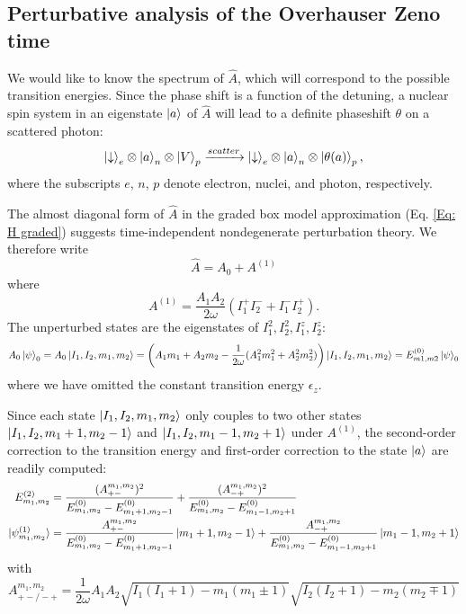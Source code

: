 \documentclass[aps, pra, amsfonts, a4paper, showpacs]{revtex4-1}
\begin{document}
\subsection*{Perturbative analysis of the Overhauser Zeno time}
We would like to know the spectrum of $\hat{A}$, which will correspond to the possible transition energies. Since the phase shift is a function of the detuning, a nuclear spin system in an eigenstate $\ket{a}$ of $\hat{A}$ will lead to a definite phaseshift $\theta$ on a scattered photon:
\[
\ket{\downarrow}_e \otimes \ket{a}_n \otimes \ket{V}_p \xrightarrow{scatter} \ket{\downarrow}_e \otimes \ket{a}_n \otimes \ket{\theta(a)}_p,
\]
where the subscripts $e$, $n$, $p$ denote electron, nuclei, and photon, respectively.

The almost diagonal form of $\hat{A}$ in the graded box model approximation (Eq. \ref{Eq: H graded}) suggests time-independent nondegenerate perturbation theory. We therefore write
\[
\hat{A} = A_0 + A^{(1)}\] where
\[ A^{(1)} = \frac{A_1A_2}{2\omega}(I_1^+ I_2^- + I_1^- I_2^+).\]
The unperturbed states are the eigenstates of $I_1^2, I_2^2, I_1^z, I_2^z$:
\[
 A_0 \ket{\psi}_0 = A_0 \ket{I_1,I_2,m_1,m_2} = \left( A_1m_1 + A_2 m_2 - \frac{1}{2\omega}(A_1^2 m_1^2 + A_2^2 m_2^2) \right) \ket{I_1,I_2,m_1,m_2} = E_{m1,m2}^{(0)}\ket{\psi}_0
\]
where we have omitted the constant transition energy $\epsilon_z$.

Since each state $\ket{I_1,I_2,m_1,m_2}$ only couples to two other states $\ket{I_1,I_2,m_1+1,m_2-1}$ and $\ket{I_1,I_2,m_1-1,m_2+1}$ under $A^{(1)}$, the second-order correction to the transition energy and first-order correction to the state $\ket{a}$ are readily computed:
\begin{equation}\begin{split}
E_{m_1,m_2}^{(2)}&=\frac{(A_{+-}^{m_1,m_2})^2}{E_{m_1,m_2}^{(0)} - E_{m_1+1,m_2-1}^{(0)}} + \frac{(A_{-+}^{m_1,m_2})^2}{E_{m_1,m_2}^{(0)} - E_{m_1-1,m_2+1}^{(0)}} \\
\ket{\psi_{m_1,m_2}^{(1)}}&=\frac{A_{+-}^{m_1,m_2}}{E_{m_1,m_2}^{(0)} - E_{m_1+1,m_2-1}^{(0)}} \ket{m_1 + 1, m_2 - 1} + \frac{A_{-+}^{m_1,m_2}}{E_{m_1,m_2}^{(0)} - E_{m_1-1,m_2+1}^{(0)}}\ket{m_1 - 1, m_2 + 1}
\end{split} \label{Eq: corrections}
\end{equation}
with 
\[
A_{+- / -+}^{m_1, m_2}=\frac{1}{2\omega}A_1A_2\sqrt{I_1(I_1+1)-m_1(m_1 \pm 1)}\sqrt{I_2(I_2+1)-m_2(m_2 \mp 1)}
\]
\end{document}
